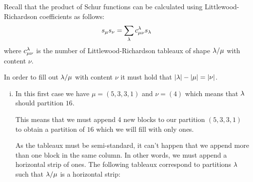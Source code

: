 \documentclass[12pt]{memoir}
\begin{document}
\begin{ptcbr}
    Recall that the product of Schur functions can be calculated using Littlewood-Richardson coefficients as follows:
    $$s_\mu s_\nu=\sum_{\lambda}c^\lambda_{\mu\nu}s_\lambda$$
    where $c^{\lambda}_{\mu\nu}$ is the number of Littlewood-Richardson tableaux of shape $\lambda/\mu$ with content $\nu$.\par 
    In order to fill out $\lambda/\mu$ with content $\nu$ it must hold that $|\lambda|-|\mu|=|\nu|$.
    \begin{enumerate}[i)]
        \itemsep=-0.4em
        \item In this first case we have $\mu=(5,3,3,1)$ and $\nu=(4)$ which means that $\lambda$ should partition $16$.\par 
        This means that we must append 4 new blocks to our partition $(5,3,3,1)$ to obtain a partition of $16$ which we will fill with only ones.\par 
        As the tableaux must be semi-standard, it can't happen that we append more than one block in the same column. In other words, we must append a horizontal strip of ones. The following tableaux correspond to partitions $\lambda$ such that $\lambda/\mu$ is a horizontal strip:
        \begin{itemize}
\end{itemize}
\end{enumerate}
\end{ptcbr}
\end{document}
